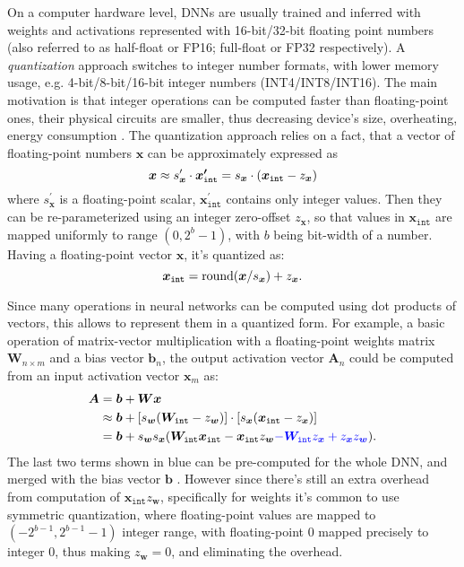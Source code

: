 On a computer hardware level, DNNs are usually trained and inferred with weights and activations represented with 16-bit/32-bit floating point numbers (also referred to as half-float or FP16; full-float or FP32 respectively). A \textit{quantization} approach switches to integer number formats, with lower memory usage, e.g. 4-bit/8-bit/16-bit integer numbers (INT4/INT8/INT16). The main motivation is that integer operations can be computed faster than floating-point ones, their physical circuits are smaller, thus decreasing device's size, overheating, energy consumption \cite{aux:fp-int-speed10}. The quantization approach relies on a fact, that a vector of floating-point numbers $\bm{x}$ can be approximately expressed as 
\begin{equation}
	\setlength\abovedisplayskip{0pt}
	\bm{x} \approx s^\prime_{\bm{x}} \cdot \bm{x^\prime_{\mathtt{int}}} = s_{\bm{x}} \cdot (\bm{x_{\mathtt{int}}} - z_{\bm{x}})
	\setlength\belowdisplayskip{0pt}
\end{equation} where $s^\prime_{\bm{x}}$ is a floating-point scalar, $\bm{x^\prime_{\mathtt{int}}}$ contains only integer values. Then they can be re-parameterized using an integer zero-offset $z_{\bm{x}}$, so that values in $\bm{x_{\mathtt{int}}}$ are mapped uniformly to range $(0, 2^b-1)$, with $b$ being bit-width of a number. Having a floating-point vector $\bm{x}$, it's quantized as:  
\begin{equation}
	\setlength\abovedisplayskip{0pt}
	\bm{x_{\mathtt{int}}} = \text{round}(\bm{x}/s_{\bm{x}}) + z_{\bm{x}}.
	\setlength\belowdisplayskip{0pt}
\end{equation}

Since many operations in neural networks can be computed using dot products of vectors, this allows to represent them in a quantized form. For example, a basic operation of matrix-vector multiplication with a floating-point weights matrix $\bm{W}_{n \times m}$ and a bias vector $\bm{b}_n$, the output activation vector $\bm{A}_n$  could be computed from an input activation vector $\bm{x}_m$ as:
\setlength\abovedisplayskip{0pt}
\begin{align}
\begin{split}
	\bm{A} &= \bm{b} + \bm{W} \bm{x}\\
  &\approx \bm{b}
  + [s_{\bm{w}} (\bm{W}_{\mathtt{int}} - z_{\bm{w}})]
  \cdot [s_{\bm{x}} (\bm{x}_{\mathtt{int}} - z_{\bm{x}})] \\
  &=\bm{b}
  + s_{\bm{w}} s_{\bm{x}} ( 
  \bm{W}_{\mathtt{int}} \bm{x}_{\mathtt{int}}
  - \bm{x}_{\mathtt{int}} z_{\bm{w}}
  \textcolor{blue}{- \bm{W}_{\mathtt{int}} z_{\bm{x}}
  + z_{\bm{x}} z_{\bm{w}}}).
	\setlength\belowdisplayskip{0pt}
\end{split}
\end{align} The last two terms shown in blue can be pre-computed for the whole DNN, and merged with the bias vector $\bm{b}$ \cite{dnn:quant-white21}. However since there's still an extra overhead from computation of $\bm{x}_{\mathtt{int}} z_{\bm{w}}$, specifically for weights it's common to use symmetric quantization, where floating-point values are mapped to $(-2^{b-1}, 2^{b-1}-1)$ integer range, with floating-point 0 mapped precisely to integer 0, thus making $z_{\bm{w}} = 0$, and eliminating the overhead. 

